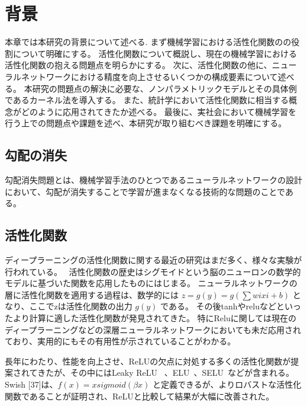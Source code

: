 \chapter{背景}
\label{background}

本章では本研究の背景について述べる.
まず機械学習における活性化関数のの役割について明確にする。
活性化関数について概説し、現在の機械学習における活性化関数の抱える問題点を明らかにする。
次に、活性化関数の他に、ニューラルネットワークにおける精度を向上させるいくつかの構成要素について述べる。
本研究の問題点の解決に必要な、ノンパラメトリックモデルとその具体例であるカーネル法を導入する。
また、統計学において活性化関数に相当する概念がどのように応用されてきたか述べる。
最後に、実社会において機械学習を行う上での問題点や課題を述べ、本研究が取り組むべき課題を明確にする。



\section{勾配の消失}
勾配消失問題とは、機械学習手法のひとつであるニューラルネットワークの設計において、勾配が消失することで学習が進まなくなる技術的な問題のことである。


\section{活性化関数}

ディープラーニングの活性化関数に関する最近の研究はまだ多く、様々な実験が 行われている。~\cite{study_af}
活性化関数の歴史はシグモイドという脳のニューロンの数学的モデルに基づいた関数を応用したものにはじまる。
ニューラルネットワークの層に活性化関数を適用する過程は、数学的には $ z=g(y)=g(\sum wixi+b) $ となり、ここでzは活性化関数の出力 $ g(y) $ である。
その後tanhやreluなどといったより計算に適した活性化関数が発見されてきた。
特にReluに関しては現在のディープラーニングなどの深層ニューラルネットワークにおいても未だ応用されており、実用的にもその有用性が示されていることがわかる。

長年にわたり、性能を向上させ、ReLUの欠点に対処する多くの活性化関数が提案されてきたが、その中にはLeaky ReLU ~\cite{leaky_relu}、ELU~\cite{elu}、SELU~\cite{selu}などが含まれる。
Swish [37]は、$ f(x)=xsigmoid(\beta x) $ と定義できるが、よりロバストな活性化関数であることが証明され、ReLUと比較して結果が大幅に改善された。

~\cite{Mish}~\cite{ReLU}~\cite{trend_af}~\cite{evo_af}~\cite{study_af}~\cite{parametric_af}~\cite{isotron}~\cite{efficient_sim}~\cite{lsim}~\cite{sim}~\cite{ichimura}~\cite{Evolving}~\cite{swish}~\cite{resnte}~\cite{sim}

